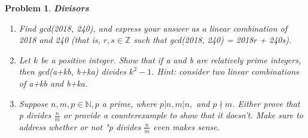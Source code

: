 \documentclass{article}
\newtheorem{problem}{Problem}
\theoremstyle{definition}
\begin{document}
\begin{problem}
\textbf{Divisors}
\begin{enumerate}[label = \alph*)]
    \item Find gcd(2018, 240), and express your answer as a linear combination of 2018 and 240 (that is, $r, s \in \mathbb{Z}$ such that gcd(2018, 240) = 2018r + 240s).
    
    \item Let $k$ be a positive integer. Show that if a and b are relatively prime integers, then gcd(a+kb, b+ka) divides $k^2-1$. Hint: consider two linear combinations of a+kb and b+ka.
    
    \item Suppose $n, m, p \in \mathbb{N}, p$ a prime, where $p|n, m| n,$ and $p\nmid m$. Either prove that p divides $\frac{n}{m}$ or provide a counterexample to show that it doesn't. Make sure to address whether or not "p divides $\frac{n}{m}$ even makes sense.
\end{enumerate}
\end{problem}
\end{document}
